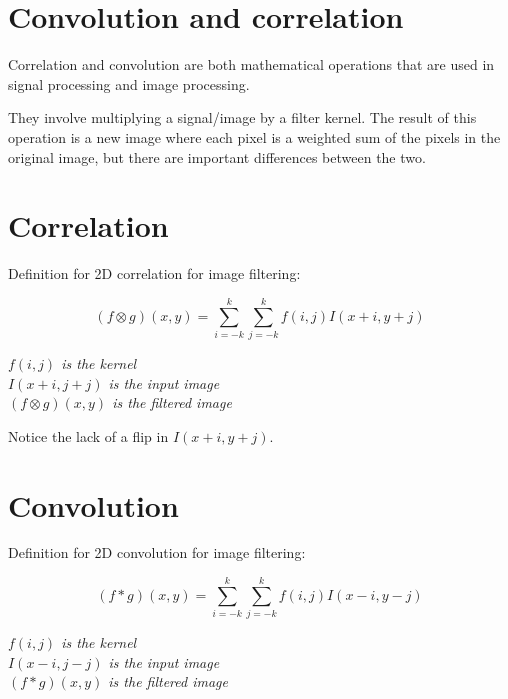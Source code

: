 \documentclass{article}
\begin{document}
\newpage

\section*{Convolution and correlation}

Correlation and convolution are both mathematical operations that are used in signal processing and image processing. 

They involve multiplying a signal/image by a filter kernel. The result of this operation is a new image where each pixel is a weighted sum of the pixels in the original image, but there are important differences between the two.

\section*{Correlation}

Definition for 2D correlation for image filtering:

\begin{equation*}
    (f \otimes g)(x, y) = \sum_{i = -k}^{k} \sum_{j = -k}^{k} f(i, j)I(x+i, y+j)
\end{equation*}

\begin{center}
    \textit{$f(i, j)$ is the kernel} \\
    \textit{$I(x+i, j+j)$ is the input image} \\
    \textit{$(f \otimes g)(x, y)$ is the filtered image}
\end{center}

Notice the lack of a flip in $I(x+i, y+j)$.

\section*{Convolution}

Definition for 2D convolution for image filtering:

\begin{equation*}
    (f * g)(x, y) = \sum_{i=-k}^{k} \sum_{j=-k}^{k} f(i, j)I(x-i, y-j)    
\end{equation*}

\begin{center}
    \textit{$f(i, j)$ is the kernel} \\
    \textit{$I(x-i, j-j)$ is the input image} \\
    \textit{$(f*g)(x, y)$ is the filtered image}
\end{center}
\end{document}

